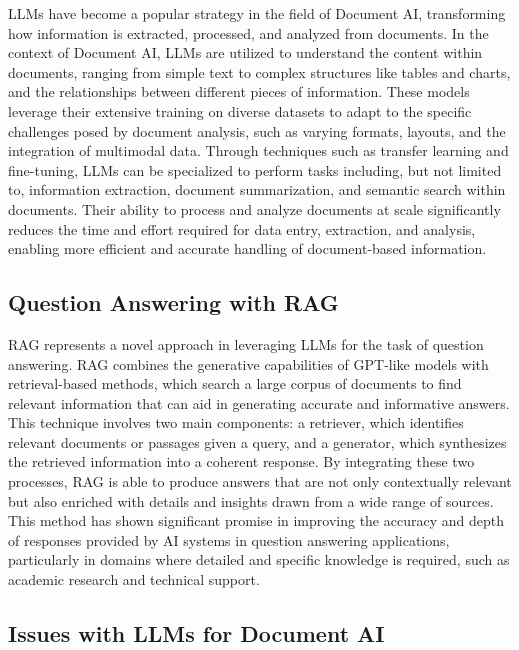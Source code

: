\documentclass[english, 12pt, a4paper, elec, utf8, a-2b, online]{aaltothesis}
\begin{document}
\ac{LLM}s have become a popular strategy in the field of Document \ac{AI}, transforming how information is extracted, processed, and analyzed from documents.
In the context of Document \ac{AI}, \ac{LLM}s are utilized to understand the content within documents, ranging from simple text to complex structures like tables and charts, and the relationships between different pieces of information.
These models leverage their extensive training on diverse datasets to adapt to the specific challenges posed by document analysis, such as varying formats, layouts, and the integration of multimodal data.
Through techniques such as transfer learning and fine-tuning, \ac{LLM}s can be specialized to perform tasks including, but not limited to, information extraction, document summarization, and semantic search within documents.
Their ability to process and analyze documents at scale significantly reduces the time and effort required for data entry, extraction, and analysis, enabling more efficient and accurate handling of document-based information.

\subsection{Question Answering with RAG}

\ac{RAG} represents a novel approach in leveraging \ac{LLM}s for the task of question answering.
\ac{RAG} combines the generative capabilities of GPT-like models with retrieval-based methods, which search a large corpus of documents to find relevant information that can aid in generating accurate and informative answers.
This technique involves two main components: a retriever, which identifies relevant documents or passages given a query, and a generator, which synthesizes the retrieved information into a coherent response.
By integrating these two processes, \ac{RAG} is able to produce answers that are not only contextually relevant but also enriched with details and insights drawn from a wide range of sources.
This method has shown significant promise in improving the accuracy and depth of responses provided by \ac{AI} systems in question answering applications, particularly in domains where detailed and specific knowledge is required, such as academic research and technical support.

\subsection{Issues with LLMs for Document AI}
\end{document}
